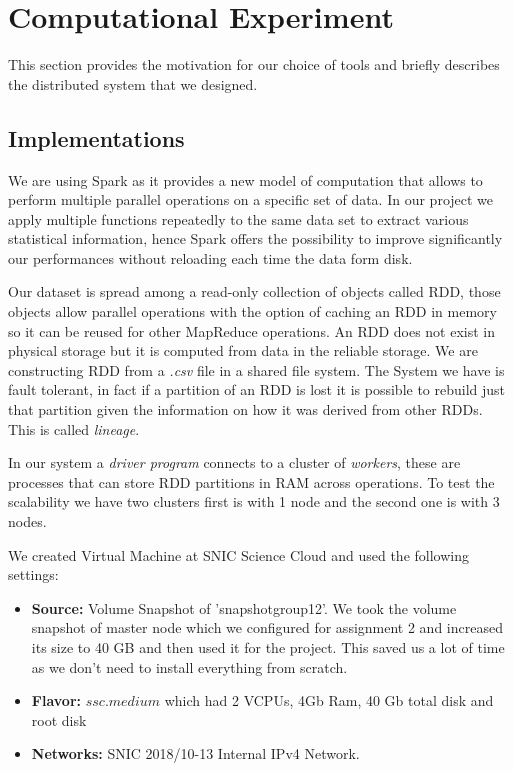 \section{Computational Experiment}


This section provides the motivation for our choice of tools and briefly describes the distributed system that we designed. 

\subsection{Implementations}
We are using Spark as it provides a new model of computation that allows to perform multiple parallel operations on a specific set of data. In our project we apply multiple functions repeatedly to the same data set to extract various statistical information, hence Spark offers the possibility to improve significantly our performances without reloading each time the data form disk\cite{Sparkzaharia}.

Our dataset is spread among a read-only collection of objects called RDD, those objects allow parallel operations with the option of caching an RDD in memory so it can be reused for other MapReduce operations. An RDD does not exist in physical storage but it is computed from data in the reliable storage. 
We are constructing RDD from a \textit{.csv} file in a shared file system. The System we have is fault tolerant, in fact if a partition of an RDD is lost it is possible to rebuild just that partition given the information on how it was derived from other RDDs. This is called \textit{lineage}\cite{Sparkzaharia}.

In our system a \textit{driver program} connects to a cluster of \textit{workers}, these are processes that can store RDD partitions in RAM across operations\cite{RDD}. To test the scalability we have two clusters first is with 1 node and the second one is with 3 nodes.\newline

We created Virtual Machine at SNIC Science Cloud \cite{snic} and used the following settings:

\begin{itemize}
    \item \textbf{Source:} Volume Snapshot of 'snapshotgroup12'. We took the volume snapshot of master node which we configured for assignment 2 and increased its size to 40 GB and then used it for the project. This saved us a lot of time as we don't need to install everything from scratch.
    \item \textbf{Flavor:} $ssc.medium$ which had 2 VCPUs, 4Gb Ram, 40 Gb total disk and root disk
    \item \textbf{Networks:} SNIC 2018/10-13 Internal IPv4 Network.
    
\end{itemize}

